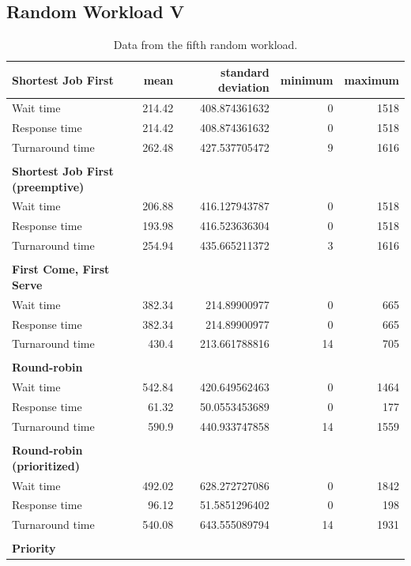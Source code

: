 \documentclass[12pt,letterpaper]{article}
\begin{document}
\begin{appendices}
			\subsection{Random Workload V}
			\begin{table}[H]
	  			\caption{Data from the fifth random workload.}
		  		\begin{tabular}{l r r r r}
					\textbf{Shortest Job First} & mean & standard deviation & minimum & maximum\\
					\hline
Wait time &		214.42 &	408.874361632 &	0 &	1518	\\
Response time &		214.42 &	408.874361632 &	0 &	1518 	\\
Turnaround time &	262.48 &	427.537705472 &	9 &	1616 	\\
					\\
					\textbf{Shortest Job First (preemptive)} \\
					\hline
					Wait time &		206.88 &	416.127943787 &	0 &	1518 	\\
Response time &		193.98 &	416.523636304 &	0 &	1518 	\\
Turnaround time &	254.94 &	435.665211372 &	3 &	1616 	\\
					\\
					\textbf{First Come, First Serve} \\
					\hline
					Wait time &		382.34 &	214.89900977 &	0 &	665 	\\
Response time &		382.34 &	214.89900977 &	0 &	665 	\\
Turnaround time &	430.4 &	213.661788816 &	14 &	705 	\\
					\\
					\textbf{Round-robin} \\
					\hline
					Wait time &		542.84 &	420.649562463 &	0 &	1464  	\\
Response time &		61.32 &	50.0553453689 &	0 &	177 	\\
Turnaround time &	590.9 &	440.933747858 &	14 &	1559 	\\
					\\
					\textbf{Round-robin (prioritized)} \\
					\hline
					Wait time &		492.02 &	628.272727086 &	0 &	1842 	\\
Response time &		96.12 &	51.5851296402 &	0 &	198 	\\
Turnaround time &	540.08 &	643.555089794 &	14 &	1931 	\\
					\\
					\textbf{Priority} \\

\end{tabular}
\end{table}
\end{appendices}
\end{document}
